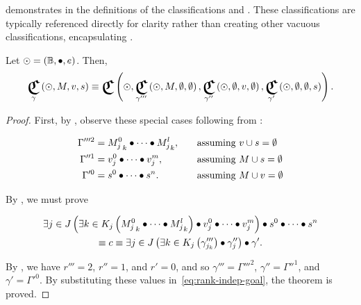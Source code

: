  demonstrates  in the
  definitions of the classifications  and
  .
These classifications are typically referenced directly for clarity rather
  than creating other vacuous classifications,
    encapsulating .


\begin{theorem}
  Let $\odot=\left({\mathbb{B}},{\bullet},{e}\right)$.
  Then,
  \begin{equation}
    \Classify_\gamma\left(\odot,M,v,s\right)
      \equiv \Classify\left(
        \odot,
        \Classify_{\gamma'''}\left(\odot,M,\emptyset,\emptyset\right),
        \Classify_{\gamma''}\left(\odot,\emptyset,v,\emptyset\right),
        \Classify_{\gamma'}\left(\odot,\emptyset,\emptyset,s\right)
      \right).
  \end{equation}
\end{theorem}

\begin{proof}
  First,
    by ,
    observe these special cases following from :

  \begin{equation}
  \begin{alignedat}{3}
    \Gamma'''^2 &= {M^0_j}_k \bullet\cdots\bullet {M^l_j}_k, \qquad&&\text{assuming $v\cup s=\emptyset$} \\
    \Gamma''^1 &= v^0_j\bullet\cdots\bullet v^m_j,        &&\text{assuming $M\cup s=\emptyset$} \\
    \Gamma'^0 &= s^0\bullet\cdots\bullet s^n.      &&\text{assuming $M\cup v=\emptyset$}
  \end{alignedat}
  \end{equation}

  By ,
    we must prove

  \begin{multline}\label{eq:rank-indep-goal}
    \Exists{j\in J}{
        \Exists{k\in K_j}{\cpredmatseq}
        \bullet \cpredvecseq
      }
      \bullet \cpredscalarseq \\
    \equiv c \equiv
    \Exists{j\in J}{
        \Exists{k\in K_j}{\gamma'''_{j_k}}
        \bullet \gamma''_j
      }
      \bullet \gamma'.
  \end{multline}

  By ,
    we have $r'''=2$, $r''=1$, and $r'=0$,
    and so $\gamma'''=\Gamma'''^2$,
      $\gamma''=\Gamma''^1$,
      and $\gamma'=\Gamma'^0$.
  By substituting these values in~\ref{eq:rank-indep-goal},
    the theorem is proved.
\end{proof}

